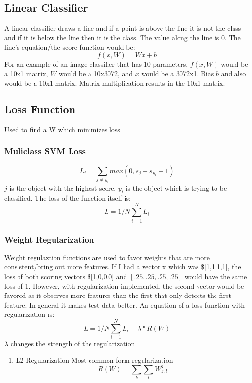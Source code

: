 \documentclass[11pt]{article}
\begin{document}
\subsection{Linear Classifier}
\label{sec-3-2}
A linear classifier draws a line and if a point is above the line it is not the class and if it is 
below the line then it is the class. The value along the line is 0. The line's equation/the score function would be:
\begin{equation}
f(x, W) = Wx + b
\end{equation}
For an example of an image classifier that has 10 parameters, $f(x, W)$  would be a 10x1 matrix, 
$W$ would be a 10x3072, and $x$ would be a 3072x1. Bias $b$ and also  would be a 10x1 matrix. 
Matrix multiplication results in the 10x1 matrix.
\subsection{Loss Function}
\label{sec-3-3}
Used to find a W which minimizes loss
\subsubsection{Muliclass SVM Loss}
\label{sec-3-3-1}
\begin{equation}
L_i = \sum_{j \neq y_i} max(0, s_j - s_y_i + 1)
\end{equation}
$j$ is the object with the highest score. $y_i$ is the object which is trying to be classified.
The loss of the function itself is:
\begin{equation}
L = 1/N  \sum_{i=1}^{N} L_i 
\end{equation}
\subsubsection{Weight Regularization}
\label{sec-3-3-2}
Weight regulaztion functions are used to favor weights that are more consistent/bring out more features. 
If I had a vector x which was \$[1,1,1,1], the loss of both scoring vectors \$[1,0,0,0] and $[.25,.25,.25,.25]$ would have the same loss of 1.
However, with regularization implemented, the second vector would be favored as it observes more features than 
the first that only detects the first feature. In general it makes test data better.
An equation of a loss function with regularization is:
\begin{equation}
L = 1/N  \sum_{i=1}^{N} L_i + \lambda*R(W)
\end{equation}
$\lambda$ changes the strength of the regularization
\begin{enumerate}
\item L2 Regularization
\label{sec-3-3-2-1}
Most common form regularization
\begin{equation}
R(W) = \sum_{k} \sum_{l} W_{k,l}^2
\end{equation}
\end{enumerate}
\end{document}
